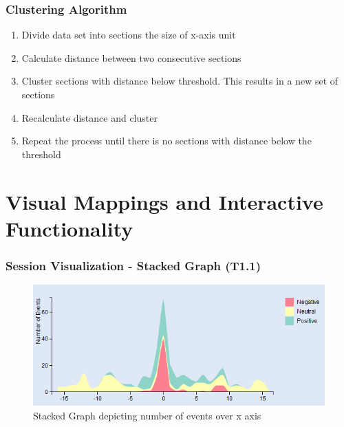 \documentclass{beamer}
\begin{document}
\begin{frame}
\frametitle{Clustering Algorithm}
\begin{enumerate}
\item Divide data set into sections the size of x-axis unit
\item Calculate distance between two consecutive sections
\item Cluster sections with distance below threshold. This results in a new set of sections
\item Recalculate distance and cluster
\item Repeat the process until there is no sections with distance below the threshold
\end{enumerate}
\end{frame}

\section{Visual Mappings and Interactive Functionality}
\begin{frame}
\frametitle{Session Visualization - Stacked Graph (T1.1)}
\begin{figure}
\includegraphics[scale=0.7]{images/stackedgraph_linear.png}
\caption{Stacked Graph depicting number of events over x axis}
\end{figure}
\end{frame}
\end{document}
